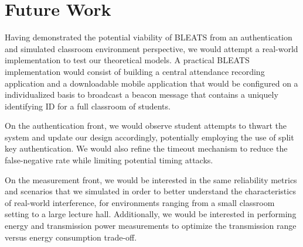 \section{Future Work}

\label{sec:future}

Having demonstrated the potential viability of BLEATS from an authentication
and simulated classroom environment perspective, we would attempt a real-world
implementation to test our theoretical models. A practical BLEATS
implementation would consist of building a central attendance recording
application and a downloadable mobile application that would be configured on a
individualized basis to broadcast a beacon message that contains a uniquely
identifying ID for a full classroom of students.  

On the authentication front, we would observe student attempts to thwart the
system and update our design accordingly, potentially employing the use of
split key authentication. We would also refine the timeout mechanism to reduce
the false-negative rate while limiting potential timing attacks.

On the measurement front, we would be interested in the same reliability
metrics and scenarios that we simulated in order to better understand the
characteristics of real-world interference, for environments ranging from a
small classroom setting to a large lecture hall.  Additionally, we would be
interested in performing energy and transmission power measurements to optimize
the transmission range versus energy consumption trade-off. 


